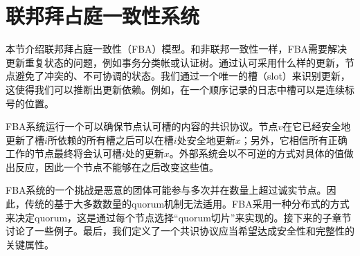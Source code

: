 \section{联邦拜占庭一致性系统}

本节介绍联邦拜占庭一致性（FBA）模型。和非联邦一致性一样，FBA需要解决更新重复状态的问题，例如事务分类帐或认证树。通过认可采用什么样的更新，节点避免了冲突的、不可协调的状态。我们通过一个唯一的槽（slot）来识别更新，这使得我们可以推断出更新依赖。例如，在一个顺序记录的日志中槽可以是连续标号的位置。

FBA系统运行一个可以确保节点认可槽的内容的共识协议。节点$v$在它已经安全地更新了槽$i$所依赖的所有槽之后可以在槽$i$处安全地更新$x$；另外，它相信所有正确工作的节点最终将会认可槽$i$处的更新$x$。外部系统会以不可逆的方式对具体的值做出反应，因此一个节点不能够在之后改变这些值。

FBA系统的一个挑战是恶意的团体可能参与多次并在数量上超过诚实节点。因此，传统的基于大多数数量的quorum机制无法适用。FBA采用一种分布式的方式来决定quorum，这是通过每个节点选择``quorum切片''来实现的。接下来的子章节讨论了一些例子。最后，我们定义了一个共识协议应当希望达成安全性和完整性的关键属性。



